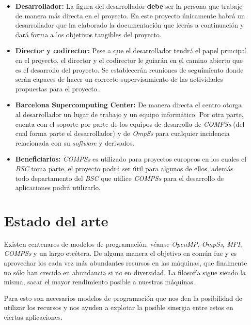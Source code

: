\begin{itemize}
 \item \textbf{Desarrollador:} La figura del desarrollador \textbf{debe} ser la persona que trabaje de manera más directa en el proyecto. En este proyecto únicamente habrá un desarrollador que ha elaborado la documentación que leerás a continuación y dará forma a los objetivos tangibles del proyecto.  
 \item \textbf{Director y codirector:} Pese a que el desarrollador tendrá el papel principal en el proyecto, el director y el codirector le guiarán en el camino abierto que es el desarrollo del proyecto. Se establecerán reuniones de seguimiento donde serán capaces de hacer un correcto supervisamiento de las actividades propuestas para el proyecto.
 \item \textbf{Barcelona Supercomputing Center:} De manera directa el centro otorga al desarrollador un lugar de trabajo y un equipo informático. Por otra parte, cuenta con el soporte por parte de los equipos de desarrollo de \textit{COMPSs} (del cual forma parte el desarrollador) y de \textit{OmpSs} para cualquier incidencia relacionada con su \textit{software} y derivados.
 \item \textbf{Beneficiarios:} \textit{COMPSs} es utilizado para proyectos europeos en los cuales el \textit{BSC} toma parte, el proyecto podrá ser útil para algunos de ellos, además todo departamento del \textit{BSC} que utilice \textit{COMPSs} para el desarrollo de aplicaciones podrá utilizarlo.
\end{itemize}

\section{Estado del arte}

Existen centenares de modelos de programación, véanse \textit{OpenMP}, \textit{OmpSs}, \textit{MPI}, \textit{COMPSs} y un largo etcétera. De alguna manera el objetivo en común fue y es aprovechar los cada vez más abundantes recursos en las máquinas, que finalmente no sólo han crecido en abundancia si no en diversidad. La filosofía sigue siendo la misma, sacar el mayor rendimiento posible a nuestras máquinas. 
\par\bigskip

Para esto son necesarios modelos de programación que nos den la posibilidad de utilizar los recursos y nos ayuden a explotar la posible sinergia entre estos en ciertas aplicaciones. 
\par\bigskip

